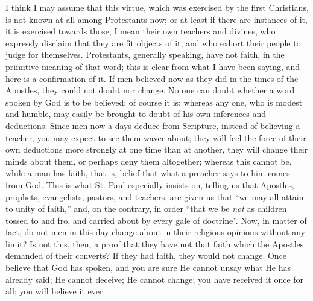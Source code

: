 I think I may assume that this virtue, which was exercised by the
first Christians, is not known at all among Protestants now; or at
least if there are instances of it, it is exercised towards those, I
mean their own teachers and divines, who expressly disclaim that they
are fit objects of it, and who exhort their people to judge for
themselves. Protestants, generally speaking, have not faith, in the
primitive meaning of that word; this is clear from what I have been
saying, and here is a confirmation of it. If men believed now as they
did in the times of the Apostles, they could not doubt nor change. No
one can doubt whether a word spoken by God is to be believed; of
course it is; whereas any one, who is modest and humble, may easily be
brought to doubt of his own inferences and deductions. Since men
now-a-days deduce from Scripture, instead of believing a teacher, you
may expect to see them waver about; they will feel the force of their
own deductions more strongly at one time than at another, they will
change their minds about them, or perhaps deny them altogether;
whereas this cannot be, while a man has faith, that is, belief that
what a preacher says to him comes from God. This is what St. Paul
especially insists on, telling us that Apostles, prophets,
evangelists, pastors, and teachers, are given us that ``we may all
attain to unity of faith,'' and, on the contrary, in order
``that we be \emph{not} as children tossed to and fro, and carried
about by every gale of doctrine''. Now, in matter of fact, do not
men in this day change about in their religious opinions without any
limit? Is not this, then, a proof that they have not that faith which
the Apostles demanded of their converts? If they had faith, they would
not change. Once believe that God has spoken, and you are sure He
cannot unsay what He has already said; He cannot deceive; He cannot
change; you have received it once for all; you will believe it ever.


